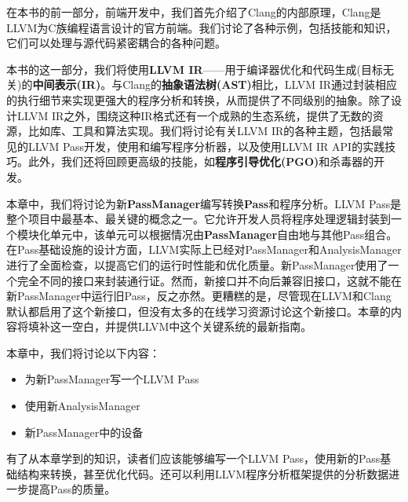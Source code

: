 在本书的前一部分，前端开发中，我们首先介绍了Clang的内部原理，Clang是LLVM为C族编程语言设计的官方前端。我们讨论了各种示例，包括技能和知识，它们可以处理与源代码紧密耦合的各种问题。

本书的这一部分，我们将使用\textbf{LLVM IR}——用于编译器优化和代码生成(目标无关)的\textbf{中间表示(IR)}。与Clang的\textbf{抽象语法树(AST)}相比，LLVM IR通过封装相应的执行细节来实现更强大的程序分析和转换，从而提供了不同级别的抽象。除了设计LLVM IR之外，围绕这种IR格式还有一个成熟的生态系统，提供了无数的资源，比如库、工具和算法实现。我们将讨论有关LLVM IR的各种主题，包括最常见的LLVM Pass开发，使用和编写程序分析器，以及使用LLVM IR API的实践技巧。此外，我们还将回顾更高级的技能，如\textbf{程序引导优化(PGO)}和杀毒器的开发。

本章中，我们将讨论为新\textbf{PassManager}编写转换\textbf{Pass}和程序分析。LLVM Pass是整个项目中最基本、最关键的概念之一。它允许开发人员将程序处理逻辑封装到一个模块化单元中，该单元可以根据情况由\textbf{PassManager}自由地与其他Pass组合。在Pass基础设施的设计方面，LLVM实际上已经对PassManager和AnalysisManager进行了全面检查，以提高它们的运行时性能和优化质量。新PassManager使用了一个完全不同的接口来封装通行证。然而，新接口并不向后兼容旧接口，这就不能在新PassManager中运行旧Pass，反之亦然。更糟糕的是，尽管现在LLVM和Clang默认都启用了这个新接口，但没有太多的在线学习资源讨论这个新接口。本章的内容将填补这一空白，并提供LLVM中这个关键系统的最新指南。

本章中，我们将讨论以下内容：

\begin{itemize}
\item 为新PassManager写一个LLVM Pass
\item 使用新AnalysisManager
\item 新PassManager中的设备
\end{itemize}

有了从本章学到的知识，读者们应该能够编写一个LLVM Pass，使用新的Pass基础结构来转换，甚至优化代码。还可以利用LLVM程序分析框架提供的分析数据进一步提高Pass的质量。












